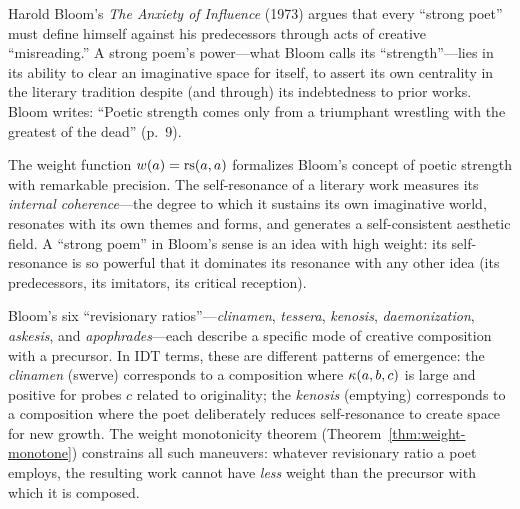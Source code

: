 \begin{interpretation}\label{interp:ch3:bloom_anxiety}
Harold Bloom's \emph{The Anxiety of Influence} (1973) argues that every
``strong poet'' must define himself against his predecessors through acts
of creative ``misreading.'' A strong poem's power---what Bloom calls its
``strength''---lies in its ability to clear an imaginative space for itself,
to assert its own centrality in the literary tradition despite (and through)
its indebtedness to prior works. Bloom writes: ``Poetic strength comes only
from a triumphant wrestling with the greatest of the dead'' (p.~9).

The weight function $w(a) = \mathrm{rs}(a, a)$ formalizes Bloom's concept of poetic
strength with remarkable precision. The self-resonance of a literary work
measures its \emph{internal coherence}---the degree to which it sustains its
own imaginative world, resonates with its own themes and forms, and generates
a self-consistent aesthetic field. A ``strong poem'' in Bloom's sense is
an idea with high weight: its self-resonance is so powerful that it
dominates its resonance with any other idea (its predecessors, its
imitators, its critical reception).

Bloom's six ``revisionary ratios''---\emph{clinamen}, \emph{tessera},
\emph{kenosis}, \emph{daemonization}, \emph{askesis}, and
\emph{apophrades}---each describe a specific mode of creative
composition with a precursor. In IDT terms, these are different patterns
of emergence: the \emph{clinamen} (swerve) corresponds to a composition
where $\kappa(a, b, c)$ is large and positive for probes $c$ related to
originality; the \emph{kenosis} (emptying) corresponds to a composition
where the poet deliberately reduces self-resonance to create space for new
growth. The weight monotonicity theorem
(Theorem~\ref{thm:weight-monotone}) constrains all such maneuvers:
whatever revisionary ratio a poet employs, the resulting work cannot have
\emph{less} weight than the precursor with which it is composed.
\end{interpretation}


